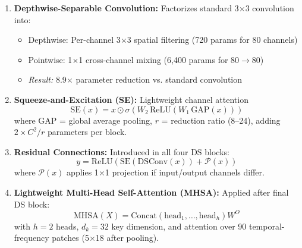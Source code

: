 \documentclass[conference]{IEEEtran}
\begin{document}
\begin{enumerate}
    \item \textbf{Depthwise-Separable Convolution:} Factorizes standard 3$\times$3 convolution into:
    \begin{itemize}
        \item Depthwise: Per-channel 3$\times$3 spatial filtering (720 params for 80 channels)
        \item Pointwise: 1$\times$1 cross-channel mixing (6,400 params for 80$\to$80)
        \item \textit{Result:} 8.9$\times$ parameter reduction vs. standard convolution
    \end{itemize}

    \item \textbf{Squeeze-and-Excitation (SE):} Lightweight channel attention~\cite{hu2018squeeze}
    \begin{equation}
        \text{SE}(x) = x \odot \sigma\left(W_2 \, \text{ReLU}(W_1 \, \text{GAP}(x))\right)
    \end{equation}
    where GAP = global average pooling, $r$ = reduction ratio (8--24), adding $2 \times C^2/r$ parameters per block.

    \item \textbf{Residual Connections:} Introduced in all four DS blocks:
    \begin{equation}
        y = \text{ReLU}\left(\text{SE}(\text{DSConv}(x)) + \mathcal{P}(x)\right)
    \end{equation}
    where $\mathcal{P}(x)$ applies 1$\times$1 projection if input/output channels differ.

    \item \textbf{Lightweight Multi-Head Self-Attention (MHSA):} Applied after final DS block:
    \begin{equation}
        \text{MHSA}(X) = \text{Concat}(\text{head}_1, \ldots, \text{head}_h) W^O
    \end{equation}
    with $h=2$ heads, $d_k=32$ key dimension, and attention over 90 temporal-frequency patches (5$\times$18 after pooling).
\end{enumerate}
\end{document}
